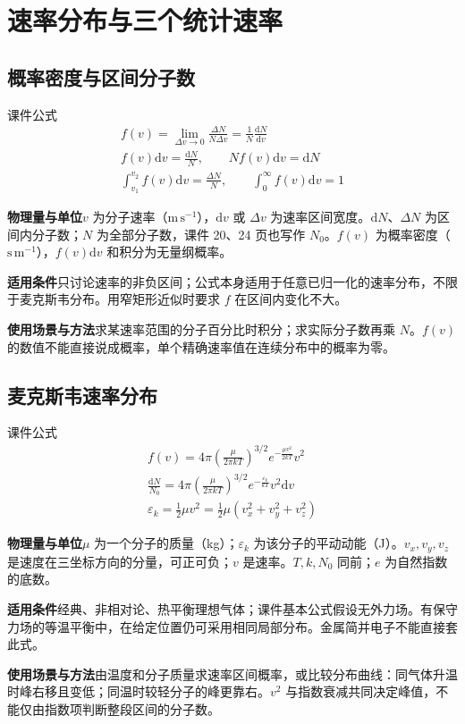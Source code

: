 \documentclass[UTF8,fontset=none,zihao=-4,a4paper]{ctexart}
\newcommand{\chapterpage}[1]{\clearpage\section{#1}}
\newcommand{\explain}[3]{\par\noindent\textbf{物理量与单位}\quad #1\par
\noindent\textbf{适用条件}\quad #2\par
\noindent\textbf{使用场景与方法}\quad #3\par}
\begin{document}
\chapterpage{速率分布与三个统计速率}
\par\noindent\begin{minipage}{\linewidth}
\subsection{概率密度与区间分子数}
\begin{infobox}[breakable=false]{课件公式}
\begin{gather*}f(v)=\lim_{\Delta v\to0}\frac{\Delta N}{N\Delta v}=\frac1N\frac{\mathrm dN}{\mathrm dv}\\f(v)\mathrm dv=\frac{\mathrm dN}{N},\qquad Nf(v)\mathrm dv=\mathrm dN\\\int_{v_1}^{v_2}f(v)\mathrm dv=\frac{\Delta N}{N},\qquad\int_0^\infty f(v)\mathrm dv=1\end{gather*}
\end{infobox}
\end{minipage}\par
\explain{$v$ 为分子速率（$\mathrm{m\,s^{-1}}$），$\mathrm dv$ 或 $\Delta v$ 为速率区间宽度。$\mathrm dN$、$\Delta N$ 为区间内分子数；$N$ 为全部分子数，课件 20、24 页也写作 $N_0$。$f(v)$ 为概率密度（$\mathrm{s\,m^{-1}}$），$f(v)\mathrm dv$ 和积分为无量纲概率。}{只讨论速率的非负区间；公式本身适用于任意已归一化的速率分布，不限于麦克斯韦分布。用窄矩形近似时要求 $f$ 在区间内变化不大。}{求某速率范围的分子百分比时积分；求实际分子数再乘 $N$。$f(v)$ 的数值不能直接说成概率，单个精确速率值在连续分布中的概率为零。}


\par\noindent\begin{minipage}{\linewidth}
\subsection{麦克斯韦速率分布}
\begin{infobox}[breakable=false]{课件公式}
\begin{gather*}f(v)=4\pi\left(\frac\mu{2\pi kT}\right)^{3/2}e^{-\frac{\mu v^2}{2kT}}v^2\\\frac{\mathrm dN}{N_0}=4\pi\left(\frac\mu{2\pi kT}\right)^{3/2}e^{-\frac{\varepsilon_k}{kT}}v^2\mathrm dv\\\varepsilon_k=\frac12\mu v^2=\frac12\mu(v_x^2+v_y^2+v_z^2)\end{gather*}
\end{infobox}
\end{minipage}\par
\explain{$\mu$ 为一个分子的质量（kg）；$\varepsilon_k$ 为该分子的平动动能（J）。$v_x,v_y,v_z$ 是速度在三坐标方向的分量，可正可负；$v$ 是速率。$T,k,N_0$ 同前；$e$ 为自然指数的底数。}{经典、非相对论、热平衡理想气体；课件基本公式假设无外力场。有保守力场的等温平衡中，在给定位置仍可采用相同局部分布。金属简并电子不能直接套此式。}{由温度和分子质量求速率区间概率，或比较分布曲线：同气体升温时峰右移且变低；同温时较轻分子的峰更靠右。$v^2$ 与指数衰减共同决定峰值，不能仅由指数项判断整段区间的分子数。}
\end{document}
